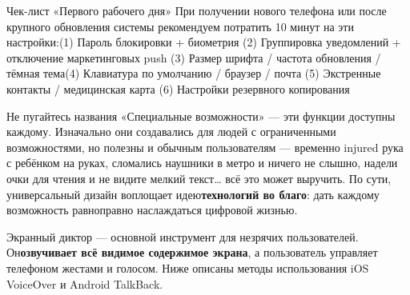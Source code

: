 \begin{tcbinfo}{Чек-лист «Первого рабочего дня»}
При получении нового телефона или после крупного обновления системы рекомендуем потратить 10 минут на эти настройки:\newline (1) Пароль блокировки + биометрия (2) Группировка уведомлений + отключение маркетинговых push (3) Размер шрифта / частота обновления / тёмная тема\newline (4) Клавиатура по умолчанию / браузер / почта (5) Экстренные контакты / медицинская карта (6) Настройки резервного копирования

\end{tcbinfo}


Не пугайтесь названия «Специальные возможности» — эти функции доступны каждому. Изначально они создавались для людей с ограниченными возможностями, но полезны и обычным пользователям — временно injured рука с ребёнком на руках, сломались наушники в метро и ничего не слышно, надели очки для чтения и не видите мелкий текст… всё это может выручить. По сути, универсальный дизайн воплощает идею\textbf{технологий во благо}: дать каждому возможность равноправно наслаждаться цифровой жизнью.


Экранный диктор — основной инструмент для незрячих пользователей. Он\textbf{озвучивает всё видимое содержимое экрана}, а пользователь управляет телефоном жестами и голосом. Ниже описаны методы использования iOS VoiceOver и Android TalkBack.

